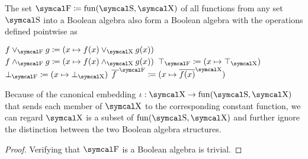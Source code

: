 \begin{proposition}\label{thm:functions_into_boolean_algebra_form_boolean_algebra}
  The set \( \CF \coloneqq \Fun(\CS, \CX) \) of all functions from any set \( \CS \) into a Boolean algebra also form a Boolean algebra with the operations defined pointwise as
  \begin{RefList}
     \( f \vee_{\CF} g \coloneqq (x \mapsto f(x) \vee_{\CX} g(x)) \)
     \( f \wedge_{\CF} g \coloneqq (x \mapsto f(x) \wedge_{\CX} g(x)) \)
     \( \top_{\CF} \coloneqq (x \mapsto \top_{\CX}) \)
     \( \bot_{\CF} \coloneqq (x \mapsto \bot_{\CX}) \)
     \( \Ol{f \ }^{\CF} \coloneqq (x \mapsto \Ol{f(x)}^{\CX}) \)
  \end{RefList}

  Because of the canonical embedding \( \iota: \CX \to \Fun(\CS, \CX) \) that sends each member of \( \CX \) to the corresponding constant function, we can regard \( \CX \) is a subset of \( \Fun(\CS, \CX) \) and further ignore the distinction between the two Boolean algebra structures.
\end{proposition}
\begin{proof}
  Verifying that \( \CF \) is a Boolean algebra is trivial.
\end{proof}

